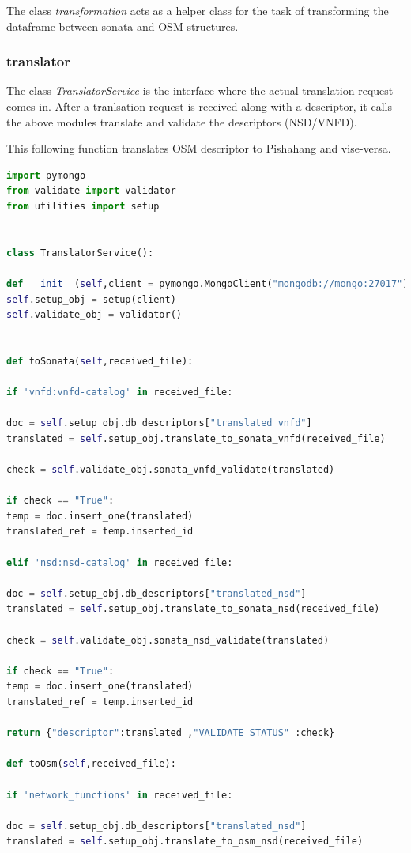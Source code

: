 The class \textit{transformation} acts as a helper class for the task of transforming the dataframe between sonata and OSM structures. 

\subsubsection{translator}

The class \textit{TranslatorService} is the interface where the actual translation request comes in. After a tranlsation request is received along with a descriptor, it calls the above modules translate and validate the descriptors (NSD/VNFD).

This following function translates OSM descriptor to Pishahang and vise-versa.
\begin{lstlisting}[language=Python,caption= Translating descriptor between Pishahang and OSM, label=lis:toSOnata]
import pymongo
from validate import validator
from utilities import setup


class TranslatorService():

def __init__(self,client = pymongo.MongoClient("mongodb://mongo:27017")):
self.setup_obj = setup(client)
self.validate_obj = validator()


def toSonata(self,received_file):

if 'vnfd:vnfd-catalog' in received_file:

doc = self.setup_obj.db_descriptors["translated_vnfd"]
translated = self.setup_obj.translate_to_sonata_vnfd(received_file)

check = self.validate_obj.sonata_vnfd_validate(translated)

if check == "True":
temp = doc.insert_one(translated)
translated_ref = temp.inserted_id

elif 'nsd:nsd-catalog' in received_file:

doc = self.setup_obj.db_descriptors["translated_nsd"]
translated = self.setup_obj.translate_to_sonata_nsd(received_file)

check = self.validate_obj.sonata_nsd_validate(translated)

if check == "True":
temp = doc.insert_one(translated)
translated_ref = temp.inserted_id

return {"descriptor":translated ,"VALIDATE STATUS" :check}

def toOsm(self,received_file):

if 'network_functions' in received_file:

doc = self.setup_obj.db_descriptors["translated_nsd"]
translated = self.setup_obj.translate_to_osm_nsd(received_file)


\end{lstlisting}

